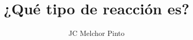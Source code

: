 \documentclass[12pt,addpoints,answers]{guia}
\title{¿Qué tipo de reacción es?}
\author{JC Melchor Pinto}
\begin{document}
\INFO%
\begin{questions}
    \questionboxed[25]{}
\end{questions}
\end{document}

